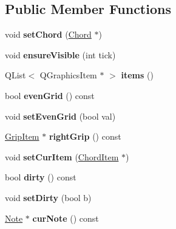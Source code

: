 \subsection*{Public Member Functions}
\begin{DoxyCompactItemize}
\item 
\mbox{\label{class_ms_1_1_chord_view_aa2b11212f012b138adaa852c7b947558}} 
void {\bfseries set\+Chord} (\hyperlink{class_ms_1_1_chord}{Chord} $\ast$)
\item 
\mbox{\label{class_ms_1_1_chord_view_a9110b5caa33f713219c02199a8a04809}} 
void {\bfseries ensure\+Visible} (int tick)
\item 
\mbox{\label{class_ms_1_1_chord_view_a481f3cd9c7b0f2a15897d1c0c4cf9692}} 
Q\+List$<$ Q\+Graphics\+Item $\ast$ $>$ {\bfseries items} ()
\item 
\mbox{\label{class_ms_1_1_chord_view_a67ceda7cc3294770edca8d26062f602f}} 
bool {\bfseries even\+Grid} () const
\item 
\mbox{\label{class_ms_1_1_chord_view_a99053edadd0b86601f14e6ede818c67e}} 
void {\bfseries set\+Even\+Grid} (bool val)
\item 
\mbox{\label{class_ms_1_1_chord_view_a3fbc86727508dc7bc2341f632c0bed9e}} 
\hyperlink{class_ms_1_1_grip_item}{Grip\+Item} $\ast$ {\bfseries right\+Grip} () const
\item 
\mbox{\label{class_ms_1_1_chord_view_a64b3298de48b29bda0b2eeed0b27a19f}} 
void {\bfseries set\+Cur\+Item} (\hyperlink{class_ms_1_1_chord_item}{Chord\+Item} $\ast$)
\item 
\mbox{\label{class_ms_1_1_chord_view_a47475760efd3575c10cd78cc3cdaa5bd}} 
bool {\bfseries dirty} () const
\item 
\mbox{\label{class_ms_1_1_chord_view_a5e0fbfca77ce3369abc0f4ab3d5ccf1e}} 
void {\bfseries set\+Dirty} (bool b)
\item 
\mbox{\label{class_ms_1_1_chord_view_a0cbf5a2cadda69450505b0fe67144987}} 
\hyperlink{class_ms_1_1_note}{Note} $\ast$ {\bfseries cur\+Note} () const
\end{DoxyCompactItemize}
